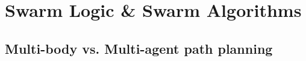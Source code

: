 
\chapter{Swarm Logic \& Swarm Algorithms}
\label{chap:swarm}

\section{Multi-body vs. Multi-agent path planning}

